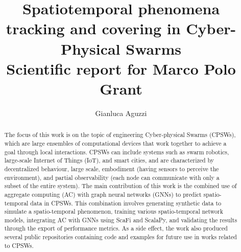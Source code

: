 \documentclass{article}
\title{
Spatiotemporal phenomena tracking and covering in Cyber-Physical Swarms \\[10pt]
\large Scientific report for Marco Polo Grant
}
\author{Gianluca Aguzzi
}
\begin{document}
\maketitle

\begin{abstract}
The focus of this work is on the topic of engineering Cyber-physical Swarms (CPSWs), which are large ensembles of computational devices that work together to achieve a goal through local interactions. CPSWs can include systems such as swarm robotics, large-scale Internet of Things (IoT), and smart cities, and are characterized by decentralized behaviour, large scale, embodiment (having sensors to perceive the environment), and partial observability (each node can communicate with only a subset of the entire system). The main contribution of this work is the combined use of aggregate computing (AC) with graph neural networks (GNNs) to predict spatio-temporal data in CPSWs. 
This combination involves generating synthetic data to simulate a spatio-temporal phenomenon, training various spatio-temporal network models, integrating AC with GNNs using ScaFi and ScalaPy, and validating the results through the export of performance metrics. As a side effect, the work also produced several public repositories containing code and examples for future use in works related to CPSWs.
\end{abstract}
\end{document}
